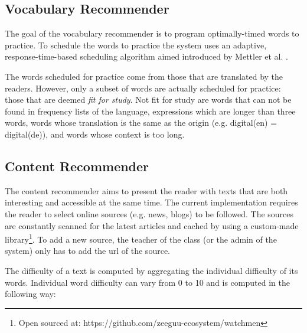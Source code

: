 
\subsection{Vocabulary Recommender}

The goal of the vocabulary recommender is to program optimally-timed words to practice. 
% 
To schedule the words to practice the system uses an adaptive, response-time-based scheduling algorithm aimed introduced by Mettler et al. \cite{Mettler14-ARTS}. 


The words scheduled for practice come from those that are translated by the readers. However, only a subset of words are actually scheduled for practice: those that are deemed {\em fit for study}. Not fit for study are words that can not be found in frequency lists of the language, expressions which are longer than three words, words whose translation is the same as the origin (e.g. digital(en) = digital(de)), and words whose context is too long. 


\subsection{Content Recommender}

The content recommender aims to present the reader with texts that are both interesting and accessible at the same time. The current implementation requires the reader to select online sources (e.g. news, blogs) to be followed. The sources are constantly scanned for the latest articles and cached by using a custom-made library\footnote{Open sourced at: https://github.com/zeeguu-ecosystem/watchmen}. To add a new source, the teacher of the class (or the admin of the system) only has to add the url of the source.

The difficulty of a text is computed by aggregating the individual difficulty of its words. Individual word difficulty can vary from 0 to 10 and is computed in the following way: 

